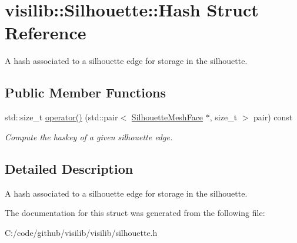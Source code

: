 \hypertarget{structvisilib_1_1_silhouette_1_1_hash}{}\section{visilib\+::Silhouette\+::Hash Struct Reference}
\label{structvisilib_1_1_silhouette_1_1_hash}


A hash associated to a silhouette edge for storage in the silhouette. 


\subsection*{Public Member Functions}
\begin{DoxyCompactItemize}
\item 
\mbox{\label{structvisilib_1_1_silhouette_1_1_hash_af79d4fadbc66f764514cfd46517f0272}} 
std\+::size\+\_\+t \mbox{\hyperlink{structvisilib_1_1_silhouette_1_1_hash_af79d4fadbc66f764514cfd46517f0272}{operator()}} (std\+::pair$<$ \mbox{\hyperlink{classvisilib_1_1_silhouette_mesh_face}{Silhouette\+Mesh\+Face}} $\ast$, size\+\_\+t $>$ pair) const
\begin{DoxyCompactList}\small\item\em Compute the haskey of a given silhouette edge. \end{DoxyCompactList}\end{DoxyCompactItemize}


\subsection{Detailed Description}
A hash associated to a silhouette edge for storage in the silhouette. 

The documentation for this struct was generated from the following file\+:\begin{DoxyCompactItemize}
\item 
C\+:/code/github/visilib/visilib/silhouette.\+h\end{DoxyCompactItemize}
